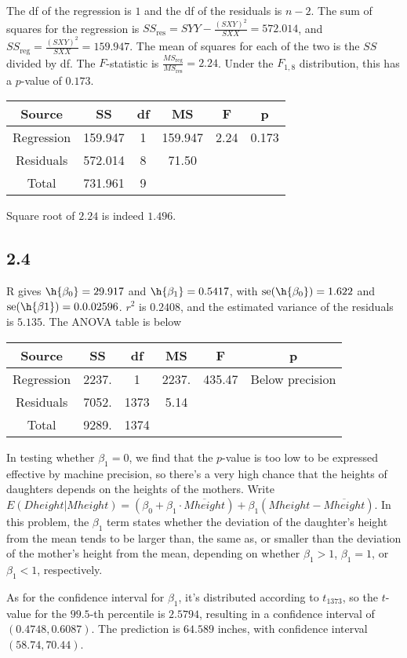 \documentclass{article}
\newcommand{\conj}{\overline}
\DeclareMathOperator{\se}{se}
\begin{document}
The df of the regression is $1$ and the df of the residuals is $n-2$. The sum of squares for the regression is $SS_\text{res}=SYY-\frac{(SXY)^2}{SXX}=572.014$, and $SS_\text{reg}=\frac{(SXY)^2}{SXX}=159.947$. The mean of squares for each of the two is the $SS$ divided by df. The $F$-statistic is $\frac{MS_\text{reg}}{MS_\text{res}}=2.24$. Under the $F_{1,8}$ distribution, this has a $p$-value of $0.173$.

\begin{tabular}{cccccc}
\hline
Source & SS & df & MS & F & p\\
\hline
Regression & 159.947 & 1 & 159.947 & 2.24 & 0.173\\
Residuals & 572.014 & 8 & 71.50 \\
Total & 731.961& 9\\
\end{tabular}

Square root of $2.24$ is indeed $1.496$.

\subsection*{2.4}
R gives $\h{\beta_0}=29.917$ and $\h{\beta_1}=0.5417$, with $\se(\h{\beta_0})=1.622$ and $\se(\h{\beta{1}})=0.0.02596$. $r^2$ is $0.2408$, and the estimated variance of the residuals is $5.135$. The ANOVA table is below

\begin{tabular}{cccccc}
\hline
Source & SS & df & MS & F & p\\
\hline
Regression & 2237. & 1 & 2237. & 435.47 & Below precision\\
Residuals & 7052. & 1373 & 5.14 \\
Total &  9289. & 1374\\
\end{tabular}

In testing whether $\beta_1=0$, we find that the $p$-value is too low to be expressed effective by machine precision, so there's a very high chance that the heights of daughters depends on the heights of the mothers.
Write $E(Dheight|Mheight)=(\beta_0+\beta_1\cdot\conj{Mheight})+\beta_1(Mheight-\conj{Mheight})$. In this problem, the $\beta_1$ term states whether the deviation of the daughter's height from the mean tends to be larger than, the same as, or smaller than the deviation of the mother's height from the mean, depending on whether $\beta_1>1$, $\beta_1=1$, or $\beta_1<1$, respectively. 

As for the confidence interval for $\beta_1$, it's distributed according to $t_{1373}$, so the $t$-value for the $99.5$-th percentile is $2.5794$, resulting in a confidence interval of $(0.4748,0.6087)$.
The prediction is $64.589$ inches, with confidence interval $(58.74,70.44)$.
\end{document}
